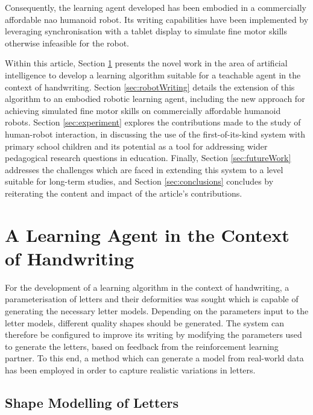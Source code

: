 \documentclass{sig-alternate}
\begin{document}
Consequently, the learning agent developed has been embodied in a commercially
affordable {\sc nao} humanoid robot. Its writing capabilities have been implemented by
leveraging synchronisation with a tablet display to simulate fine motor skills
otherwise infeasible for the robot. 

Within this article, Section \ref{sec:learningAlgorithm} presents the novel work in the area of
artificial intelligence to develop a learning algorithm suitable for a teachable
agent in the context of handwriting. Section \ref{sec:robotWriting} details the
extension of this algorithm to an embodied robotic learning agent, including the
new approach for achieving simulated fine motor skills on commercially
affordable humanoid robots.  Section \ref{sec:experiment} explores the 
contributions made to the study of human-robot interaction, in discussing the
use of the first-of-its-kind system with primary school children and its potential as a tool for
addressing wider pedagogical research questions in education. Finally, Section \ref{sec:futureWork} addresses the challenges which are faced in extending this system to a level suitable for long-term studies, and Section \ref{sec:conclusions} concludes by reiterating the content and impact of the article's contributions.



\section{A Learning Agent in the Context of Handwriting} \label{sec:learningAlgorithm}

For the development of a learning algorithm in the context of
handwriting, a parameterisation of letters and their deformities was sought
which is capable of generating the necessary letter models. Depending on the parameters input to
the letter models, different quality shapes should be generated. The system can
therefore be configured to improve its writing by modifying the parameters used
to generate the letters, based on feedback from the reinforcement learning
partner. To this end, a method which can generate a model from real-world data
has been employed in order to capture realistic variations in letters. 

\subsection{Shape Modelling of Letters} \label{sec:writingGeneration}
\end{document}
